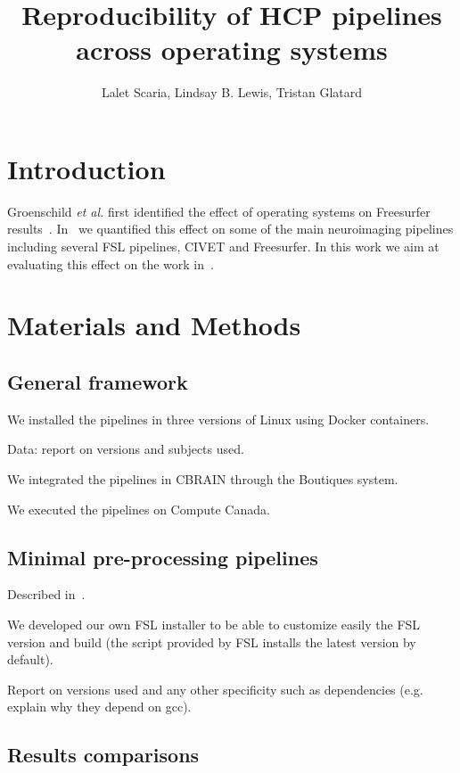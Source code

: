 \documentclass{article}
\title{Reproducibility of HCP pipelines across operating systems}
\author{Lalet Scaria, Lindsay B. Lewis, Tristan Glatard}
\begin{document}
\maketitle


\section{Introduction}

Groenschild \emph{et al.} first identified the effect of operating
systems on Freesurfer
results~\cite{Gronenschild2012}. In~\cite{10.3389/fninf.2015.00012} we
quantified this effect on some of the main neuroimaging pipelines
including several FSL pipelines, CIVET and Freesurfer. In this work we
aim at evaluating this effect on the work in~\cite{glasser2015multi}.

\section{Materials and Methods}

\subsection{General framework}

We installed the pipelines in three versions of Linux using Docker containers.

Data: report on versions and subjects used.

We integrated the pipelines in CBRAIN through the Boutiques system.

We executed the pipelines on Compute Canada.

\subsection{Minimal pre-processing pipelines}

Described in~\cite{glasser2013minimal}.

We developed our own FSL installer to be able to customize easily the FSL version and build (the script provided by FSL installs the latest version by default).

Report on versions used and any other specificity such as dependencies (e.g. explain why they depend on gcc).

\subsection{Results comparisons}
\end{document}
